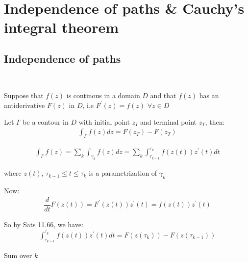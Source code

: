 \section{Independence of paths \& Cauchy's integral theorem}
\par\bigskip
\subsection{Independence of paths}\hfill\\
\par\bigskip
\begin{theo}[]{}
  Suppose that $f(z)$ is continous in a domain $D$ and that $f(z)$ has an antiderivative $F(z)$ in $D$, i.e $F^{\prime}(z) = f(z)$ $\forall z\in D$
  \par\bigskip
  \noindent Let $\Gamma $ be a contour in $D$ with initial point $z_I$ and terminal point $z_T$, then:
  \begin{equation*}
    \begin{gathered}
      \int_{\Gamma}f(z)dz = F(z_T)-F(z_T)
    \end{gathered}
  \end{equation*}
\end{theo}
\par\bigskip
\begin{prf}[]{}
  \begin{equation*}
    \begin{gathered}
      \int_{\Gamma}f(z) = \sum_{k}\int_{\gamma_k}f(z)dz = \sum_{k}\int_{\tau_{k-1}}^{\tau_k}f(z(t))z^{\prime}(t)dt
    \end{gathered}
  \end{equation*}\par
  \noindent where $z(t)$, $\tau_{k-1}\leq t\leq\tau_k$ is a parametrization of $\gamma_k$
  \par\bigskip
  \noindent Now:
  \begin{equation*}
    \begin{gathered}
      \dfrac{d}{dt}F(z(t)) = F^{\prime}(z(t))z^{\prime}(t) = f(z(t))z^{\prime}(t)
    \end{gathered}
  \end{equation*}\par
  \noindent So by Sats 11.66, we have:
  \begin{equation*}
    \begin{gathered}
      \int_{\tau_{k-1}}^{\tau_k}f(z(t))z^{\prime}(t)dt = F(z(\tau_k))-F(z(\tau_{k-1}))
    \end{gathered}
  \end{equation*}\par
  \noindent Sum over $k$
\end{prf}
